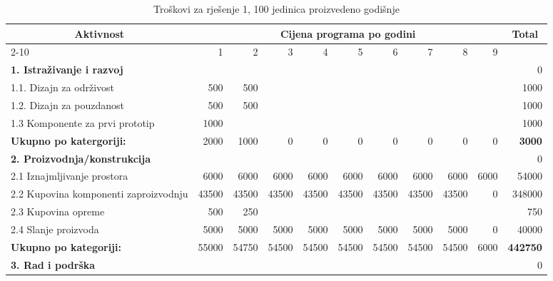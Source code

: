 \documentclass[12pt]{article}
\begin{document}
\begin{landscape}
\begin{table}[htbp]
  \centering
  \small
  \caption{Troškovi za rješenje 1, 100 jedinica proizvedeno godišnje}
    \begin{tabular}{lrrrrrrrrrr}
    \toprule
    \multicolumn{1}{c}{\multirow{2}[4]{*}{Aktivnost}} & \multicolumn{9}{c}{Cijena programa po godini}                         & \multicolumn{1}{c}{\multirow{2}[4]{*}{Total}} \\
\cmidrule{2-10}          & 1     & 2     & 3     & 4     & 5     & 6     & 7     & 8     & 9     &  \\
    \midrule
    \textbf{1. Istraživanje i razvoj} &       &       &       &       &       &       &       &       &       & 0 \\
    1.1. Dizajn za održivost & 500   & 500   &       &       &       &       &       &       &       & 1000 \\
    1.2. Dizajn za pouzdanost & 500   & 500   &       &       &       &       &       &       &       & 1000 \\
    1.3 Komponente za prvi prototip & 1000  &       &       &       &       &       &       &       &       & 1000 \\
    \midrule
    \textbf{Ukupno po katergoriji:} & 2000  & 1000  & 0     & 0     & 0     & 0     & 0     & 0     & 0     & \textbf{3000} \\
    \midrule
    \textbf{2. Proizvodnja/konstrukcija} &       &       &       &       &       &       &       &       &       & 0 \\
    2.1 Iznajmljivanje prostora & 6000  & 6000  & 6000  & 6000  & 6000  & 6000  & 6000  & 6000  & 6000  & 54000 \\
    \multicolumn{1}{p{14.715em}}{2.2 Kupovina komponenti za\newline{}proizvodnju} & 43500 & 43500 & 43500 & 43500 & 43500 & 43500 & 43500 & 43500 & 0     & 348000 \\
    2.3 Kupovina opreme & 500   & 250   &       &       &       &       &       &       &       & 750 \\
    2.4 Slanje proizvoda & 5000  & 5000  & 5000  & 5000  & 5000  & 5000  & 5000  & 5000  & 0     & 40000 \\
    \midrule
    \textbf{Ukupno po kategoriji:} & 55000 & 54750 & 54500 & 54500 & 54500 & 54500 & 54500 & 54500 & 6000  & \textbf{442750} \\
    \midrule
    \textbf{3. Rad i podrška} &       &       &       &       &       &       &       &       &       & 0 \\

\end{tabular}
\end{table}
\end{landscape}
\end{document}
